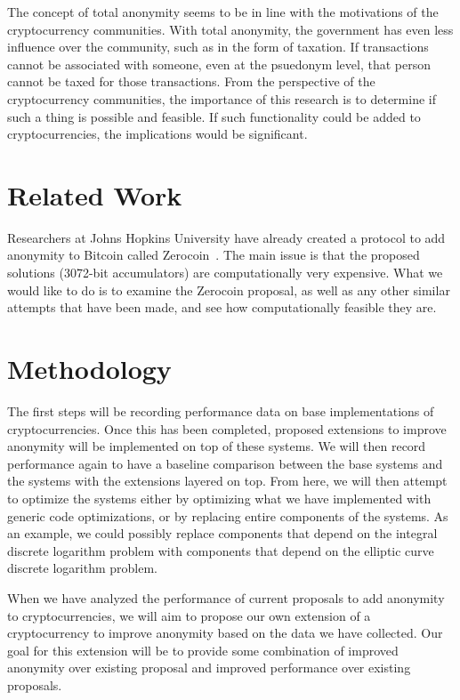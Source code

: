\documentclass[11pt]{artikel3}
\begin{document}
The concept of total anonymity seems to be in line with the motivations of the
cryptocurrency communities. With total anonymity, the government has even less
influence over the community, such as in the form of taxation. If transactions
cannot be associated with someone, even at the psuedonym level, that person
cannot be taxed for those transactions. From the perspective of the
cryptocurrency communities, the importance of this research is to determine if
such a thing is possible and feasible. If such functionality could be added to
cryptocurrencies, the implications would be significant.

\section{Related Work}
Researchers at Johns Hopkins University have already created a protocol to add
anonymity to Bitcoin called Zerocoin~\cite{Miers13}. The main issue is
that the proposed solutions (3072-bit accumulators) are computationally very
expensive. What we would like to do is to examine the Zerocoin proposal,
as well as any other similar attempts that have been made, and see how
computationally feasible they are.

\section{Methodology}
The first steps will be recording performance data on base implementations of
cryptocurrencies. Once this has been completed, proposed extensions to improve
anonymity will be implemented on top of these systems. We will then record
performance again to have a baseline comparison between the base systems and the
systems with the extensions layered on top. From here, we will then attempt to
optimize the systems either by optimizing what we have implemented with generic
code optimizations, or by replacing entire components of the systems. As an
example, we could possibly replace components that depend on the integral discrete
logarithm problem with components that depend on the elliptic curve discrete
logarithm problem.

When we have analyzed the performance of current proposals to add anonymity to
cryptocurrencies, we will aim to propose our own extension of a cryptocurrency
to improve anonymity based on the data we have collected. Our goal for this
extension will be to provide some combination of improved anonymity over
existing proposal and improved performance over existing proposals.
\end{document}
